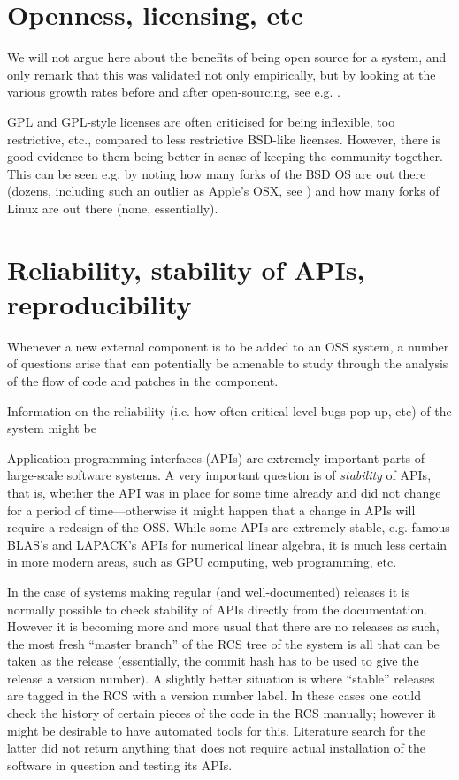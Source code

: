 \documentclass{deliverablereport}
\begin{document}
\section{Openness, licensing, etc}

We will not argue here about the benefits of being open source for a
system, and only remark that this was validated not only empirically,
but by looking at the various growth rates before and after
open-sourcing, see e.g. \cite{wp7:arfonshapeoss}.


GPL and GPL-style licenses \cite{wp7:gpl} are often criticised for being
inflexible, too restrictive, etc., compared to less restrictive BSD-like
licenses. However, there is good evidence
to them being better in sense of keeping the community together. This can be
seen e.g. by noting how many forks of the BSD OS are out there
(dozens, including such an outlier as Apple's OSX, see
\cite{wp7:bsdlist}) and how many forks of Linux are out there
(none, essentially). 

\section{Reliability, stability of APIs, reproducibility}
Whenever a new external component is to be added to an OSS system,
a number of questions arise that can potentially be amenable to study through the
analysis of the flow of code and patches in the component.

Information on the reliability (i.e. how often critical level
bugs pop up, etc) of the system might be 

Application programming interfaces (APIs) are extremely
important parts of large-scale software systems.
A very important question is of {\em stability} of APIs, that is,
whether the API was in place for some time already and did not change
for a period of time---otherwise it might happen that a change in APIs will
require a redesign of the OSS.
While some APIs are extremely stable, e.g. famous BLAS's and LAPACK's
\cite{2002:USB:567806.567807,Anderson:1990:LPL:110382.110385}
APIs for numerical linear algebra, it is much less certain in more
modern areas, such as GPU computing, web programming, etc.

In the case of systems making regular (and well-documented)
releases it is normally possible to check stability of APIs
directly from the documentation. However it is becoming more and
more usual that there are no releases as such, the most fresh
``master branch'' of the RCS tree of the system is all that
can be taken as the release (essentially, the commit
hash has to be used to give the release a version number).
A slightly better situation is where ``stable'' releases are tagged
in the RCS with a version number label.
In these cases one could check the history of certain pieces
of the code in the RCS manually; however it might be 
desirable to have automated tools for this. Literature search for
the latter did not return anything that does not require
actual installation of the software in question and testing its APIs.
\end{document}
